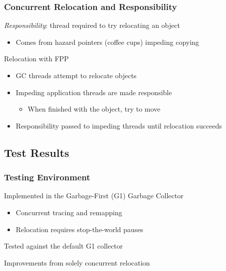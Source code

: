 \documentclass{beamer}
\newcommand{\linespace}{\vskip 0.25cm}
\begin{document}
\begin{frame}

\frametitle{Concurrent Relocation and Responsibility}


\emph{Responsibility}: thread required to try relocating an object
\begin{itemize}
\item Comes from hazard pointers (coffee cups) impeding copying
\end{itemize}

\linespace
\linespace

Relocation with FPP
\begin{itemize}
\item GC threads attempt to relocate objects
\item Impeding application threads are made responsible
\begin{itemize}
\item When finished with the object, try to move
\end{itemize}
\item Responsibility passed to impeding threads until relocation succeeds
\end{itemize}

\end{frame}



\subsection*{Test Results}

\begin{frame}

\frametitle{Testing Environment}

Implemented in the Garbage-First (G1) Garbage Collector
\begin{itemize}
\item Concurrent tracing and remapping
\item Relocation requires stop-the-world pauses
\end{itemize}

\linespace
\linespace

Tested against the default G1 collector

\linespace
\linespace

Improvements from solely concurrent relocation

\end{frame}
\end{document}
